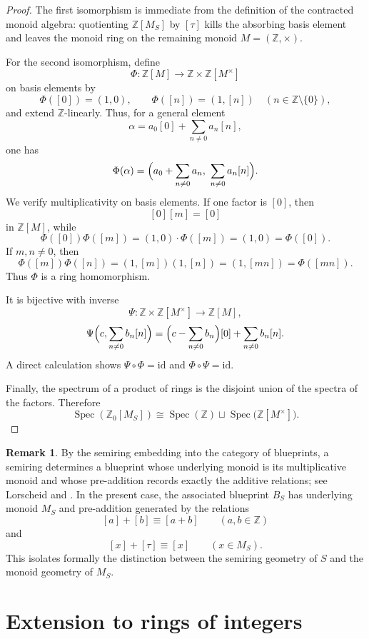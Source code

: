 \documentclass[11pt]{article}
\theoremstyle{definition}
\newtheorem{remark}[theorem]{Remark}
\newcommand{\Z}{\mathbb Z}
\newcommand{\Spec}{\operatorname{Spec}}
\newcommand{\taup}{\tau}
\begin{document}
\begin{proof}
The first isomorphism is immediate from the definition of the contracted monoid algebra: quotienting \(\Z[M_S]\) by \([\taup]\) kills the absorbing basis element and leaves the monoid ring on the remaining monoid \(M=(\Z,\times)\).

For the second isomorphism, define
\[
\Phi:\Z[M]\longrightarrow \Z\times\Z[M^\times]
\]
on basis elements by
\[
\Phi([0])=(1,0),
\qquad
\Phi([n])=(1,[n])\quad (n\in\Z\setminus\{0\}),
\]
and extend \(\Z\)-linearly.  Thus, for a general element
\[
\alpha=a_0[0]+\sum_{n\neq0} a_n[n],
\]
one has
\[
\Phi(\alpha)=\Bigl(a_0+\sum_{n\neq0} a_n,\ \sum_{n\neq0} a_n[n]\Bigr).
\]
We verify multiplicativity on basis elements.  If one factor is \([0]\), then
\[
[0][m]=[0]
\]
in \(\Z[M]\), while
\[
\Phi([0])\Phi([m])=(1,0)\cdot \Phi([m])=(1,0)=\Phi([0]).
\]
If \(m,n\neq0\), then
\[
\Phi([m])\Phi([n])=(1,[m])(1,[n])=(1,[mn])=\Phi([mn]).
\]
Thus \(\Phi\) is a ring homomorphism.

It is bijective with inverse
\[
\Psi:\Z\times\Z[M^\times]\longrightarrow\Z[M],
\]
\[
\Psi\Bigl(c,\sum_{n\neq0} b_n[n]\Bigr)=\Bigl(c-\sum_{n\neq0} b_n\Bigr)[0]+\sum_{n\neq0} b_n[n].
\]
A direct calculation shows \(\Psi\circ\Phi=\mathrm{id}\) and \(\Phi\circ\Psi=\mathrm{id}\).

Finally, the spectrum of a product of rings is the disjoint union of the spectra of the factors.  Therefore
\[
\Spec(\Z_0[M_S])\cong\Spec(\Z)\sqcup\Spec\bigl(\Z[M^\times]\bigr).
\]
\end{proof}

\begin{remark}\label{rem:blueprint}
By the semiring embedding into the category of blueprints, a semiring determines a blueprint whose underlying monoid is its multiplicative monoid and whose pre-addition records exactly the additive relations; see Lorscheid \cite[§4.1.1]{lorscheidview} and \cite[§4]{lorscheid}.  In the present case, the associated blueprint \(B_S\) has underlying monoid \(M_S\) and pre-addition generated by the relations
\[
[a]+[b]\equiv [a+b]\qquad (a,b\in\Z)
\]
and
\[
[x]+[\taup]\equiv [x]\qquad (x\in M_S).
\]
This isolates formally the distinction between the semiring geometry of \(S\) and the monoid geometry of \(M_S\).
\end{remark}

\section{Extension to rings of integers}
\end{document}
